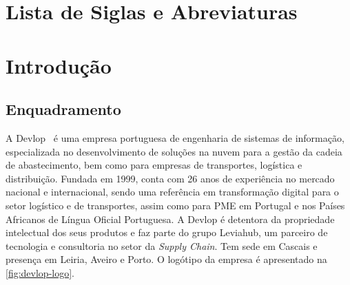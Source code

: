 \documentclass[a4paper,12pt]{report}
\begin{document}
\newpage
\chapter*{Lista de Siglas e Abreviaturas}

\begin{acronym}
\end{acronym}

\newpage

\setcounter{page}{1}
\pagestyle{mystyle}

\chapter{Introdução}

\section{Enquadramento}

A Devlop~\cite{devlop} é uma empresa portuguesa de engenharia de sistemas de informação, especializada no desenvolvimento de soluções na nuvem para a gestão da cadeia de abastecimento, bem como para empresas de transportes, logística e distribuição. Fundada em 1999, conta com 26 anos de experiência no mercado nacional e internacional, sendo uma referência em transformação digital para o setor logístico e de transportes, assim como para PME em Portugal e nos Países Africanos de Língua Oficial Portuguesa. A Devlop é detentora da propriedade intelectual dos seus produtos e faz parte do grupo Leviahub, um parceiro de tecnologia e consultoria no setor da \textit{Supply Chain}. Tem sede em Cascais e presença em Leiria, Aveiro e Porto. O logótipo da empresa é apresentado na \autoref{fig:devlop-logo}.
\end{document}
